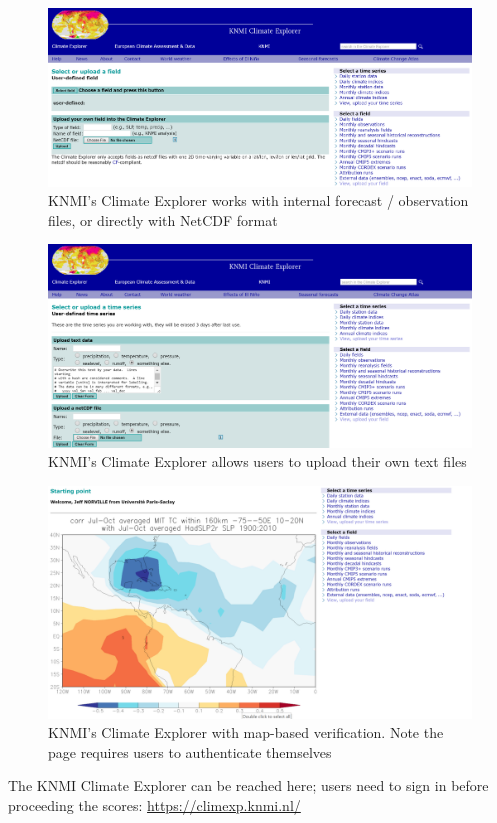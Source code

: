 \documentclass[logos,parttoc,morelanguage=french,morelanguage=german]{orsay-memoire}
\begin{document}
\begin{figure}[hp]
\centering
\includegraphics[width=0.70\linewidth]{images/vfsbKNMI1.png}
  \caption{KNMI's Climate Explorer works with internal forecast / observation files, or directly with NetCDF format}
  \label{fig:vfsbKNMI1}
\end{figure}

\begin{figure}[hp]
\centering
\includegraphics[width=0.70\linewidth]{images/vfsbKNMI2.png}
  \caption{KNMI's Climate Explorer allows users to upload their own text files}
  \label{fig:vfsbKNMI2}
\end{figure}

\begin{figure}[hp]
\centering
\includegraphics[width=0.70\linewidth]{images/vfsbKNMI3.png}
  \caption{KNMI's Climate Explorer with map-based verification. Note the page requires users to authenticate themselves}
  \label{fig:vfsbKNMI3}
\end{figure}

The KNMI Climate Explorer can be reached here; users need to sign in before proceeding the scores: \href{https://climexp.knmi.nl/}{https://climexp.knmi.nl/}
\end{document}
